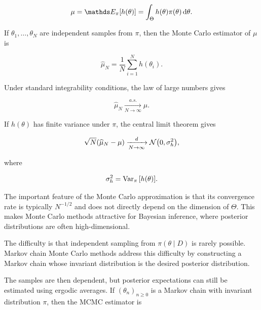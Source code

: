 \begin{equation}
    \mu
    =
    \bE_{\pi}\qty[h(\theta)]
    =
    \int_{\Theta} h(\theta)\pi(\theta)\,\dd\theta.
    \label{eq:mc-target-background}
\end{equation}

If $\theta_1,\dots,\theta_N$ are independent samples from $\pi$, then the Monte Carlo estimator of $\mu$ is

\begin{equation}
    \widehat{\mu}_N
    =
    \frac{1}{N}\sum_{i=1}^{N} h(\theta_i).
    \label{eq:mc-estimator-background}
\end{equation}

Under standard integrability conditions, the law of large numbers gives

\begin{equation}
    \widehat{\mu}_N
    \xrightarrow[N\to\infty]{a.s.}
    \mu.
    \label{eq:mc-lln-background}
\end{equation}

If $h(\theta)$ has finite variance under $\pi$, the central limit theorem gives

\begin{equation}
    \sqrt{N}\qty(\widehat{\mu}_N-\mu)
    \xrightarrow[N\to\infty]{d}
    \mathcal{N}\qty(0,\sigma_h^2),
    \label{eq:mc-clt-background}
\end{equation}

where

\begin{equation}
    \sigma_h^2
    =
    \operatorname{Var}_{\pi}\qty[h(\theta)].
    \label{eq:mc-variance-background}
\end{equation}

The important feature of the Monte Carlo approximation is that its convergence rate is typically $N^{-1/2}$ and does not directly depend on the dimension of $\Theta$.
This makes Monte Carlo methods attractive for Bayesian inference, where posterior distributions are often high-dimensional.

The difficulty is that independent sampling from $\pi(\theta\mid D)$ is rarely possible.
Markov chain Monte Carlo methods address this difficulty by constructing a Markov chain whose invariant distribution is the desired posterior distribution.

The samples are then dependent, but posterior expectations can still be estimated using ergodic averages.
If $(\theta_n)_{n\geq 0}$ is a Markov chain with invariant distribution $\pi$, then the MCMC estimator is

